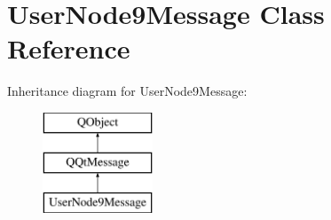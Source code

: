 \hypertarget{class_user_node9_message}{}\section{User\+Node9\+Message Class Reference}
\label{class_user_node9_message}
Inheritance diagram for User\+Node9\+Message\+:\begin{figure}[H]
\begin{center}
\leavevmode
\includegraphics[height=3.000000cm]{class_user_node9_message}
\end{center}
\end{figure}
